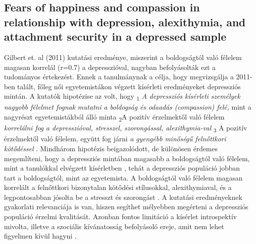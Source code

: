 \subsection{Fears of happiness and compassion in relationship
	with depression, alexithymia, and attachment
	security in a depressed sample \cite{gilbert_mcewan_catarino_baiao_palmeira_2013}}
Gilbert et. al (2011) kutatási eredménye, miszerint a boldogságtól való félelem magasan korrelál (r=0.7) a depresszióval, nagyban befolyásolták ezt a tudományos értekezést. Ennek a tanulmánynak a célja, hogy megvizsgálja a 2011-ben talált, főleg női egyetemistákon végzett kísérleti eredményeket depressziós mintán. A kutatók hipotézise az volt,  hogy \textsubscript{1} \textit{ A depressziós kísérleti személyek nagyobb félelmet fognak mutatni a boldogság és odaadás (compassion) felé,}  mint a nagyrészt egyetemis\-tákból álló minta \textsubscript{2}A pozitív érzelmektől való félelem \textit{korrelálni fog a depresszióval, stresszel, szorongással, alexithymia-val }   \textsubscript{3} A pozitív érzelmektől való félelem, együtt fog járni \textit{a gyengébb minőségű felnőttkori kötődéssel} \cite{gilbert_mcewan_catarino_baiao_palmeira_2013}. Mindhárom hipotézis beigazolódott, de különösen érdemes megemlíteni, hogy a depressziós mintában magasabb a boldogságtól való félelem, mint a tanulókkal elvégzett kísérletben \cite{gilbert_mcewan_gibbons_chotai_duarte_matos_2011}, tehát a depressziós populáció jobban tart a boldogságtól, mint az egyetemista. A boldogságtól való félelem magasan korrelált a felnőttkori bizonytalan kötődési stílusokkal, alexithymiaval, és a legpontosabban jósolta be a stresszt és szorongást \cite{gilbert_mcewan_catarino_baiao_palmeira_2013}. A kutatási eredményeknek gyakorlati relevanciája is van, hiszen segíthet mélyebben megérteni a depressziós populáció érzelmi kvalitását. Azonban fontos limitáció a kísérlet introspektív mivolta, illetve a szociális kívánatosság befolyásoló ereje, amit nem lehet figyelmen kívül hagyni \cite{gilbert_mcewan_catarino_baiao_palmeira_2013}.

